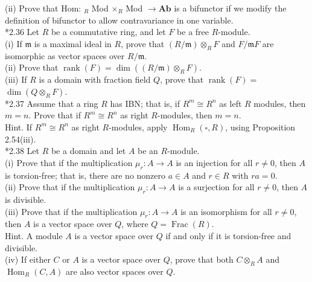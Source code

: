 \documentclass[10pt]{article}
\begin{document}
(ii) Prove that Hom: ${ }_{R}$ Mod $\times{ }_{R}$ Mod $\rightarrow \mathbf{A b}$ is a bifunctor if we modify the definition of bifunctor to allow contravariance in one variable.\\
*2.36 Let $R$ be a commutative ring, and let $F$ be a free $R$-module.\\
(i) If $\mathfrak{m}$ is a maximal ideal in $R$, prove that $(R / \mathfrak{m}) \otimes_{R} F$ and $F / \mathfrak{m} F$ are isomorphic as vector spaces over $R / \mathfrak{m}$.\\
(ii) Prove that $\operatorname{rank}(F)=\operatorname{dim}\left((R / \mathfrak{m}) \otimes_{R} F\right)$.\\
(iii) If $R$ is a domain with fraction field $Q$, prove that $\operatorname{rank}(F)=$ $\operatorname{dim}\left(Q \otimes_{R} F\right)$.\\
*2.37 Assume that a ring $R$ has IBN; that is, if $R^{m} \cong R^{n}$ as left $R$ modules, then $m=n$. Prove that if $R^{m} \cong R^{n}$ as right $R$-modules, then $m=n$.\\
Hint. If $R^{m} \cong R^{n}$ as right $R$-modules, apply $\operatorname{Hom}_{R}(\square, R)$, using Proposition 2.54(iii).\\
*2.38 Let $R$ be a domain and let $A$ be an $R$-module.\\
(i) Prove that if the multiplication $\mu_{r}: A \rightarrow A$ is an injection for all $r \neq 0$, then $A$ is torsion-free; that is, there are no nonzero $a \in A$ and $r \in R$ with $r a=0$.\\
(ii) Prove that if the multiplication $\mu_{r}: A \rightarrow A$ is a surjection for all $r \neq 0$, then $A$ is divisible.\\
(iii) Prove that if the multiplication $\mu_{r}: A \rightarrow A$ is an isomorphism for all $r \neq 0$, then $A$ is a vector space over $Q$, where $Q=\operatorname{Frac}(R)$.\\
Hint. A module $A$ is a vector space over $Q$ if and only if it is torsion-free and divisible.\\
(iv) If either $C$ or $A$ is a vector space over $Q$, prove that both $C \otimes_{R} A$ and $\operatorname{Hom}_{R}(C, A)$ are also vector spaces over $Q$.
\end{document}
